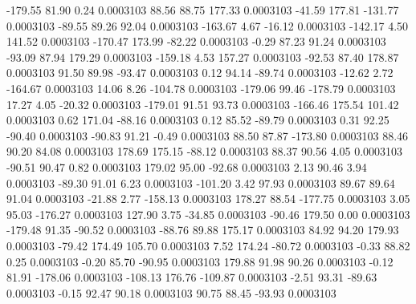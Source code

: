      -179.55       81.90        0.24     0.0003103
       88.56       88.75      177.33     0.0003103
      -41.59      177.81     -131.77     0.0003103
      -89.55       89.26       92.04     0.0003103
     -163.67        4.67      -16.12     0.0003103
     -142.17        4.50      141.52     0.0003103
     -170.47      173.99      -82.22     0.0003103
       -0.29       87.23       91.24     0.0003103
      -93.09       87.94      179.29     0.0003103
     -159.18        4.53      157.27     0.0003103
      -92.53       87.40      178.87     0.0003103
       91.50       89.98      -93.47     0.0003103
        0.12       94.14      -89.74     0.0003103
      -12.62        2.72     -164.67     0.0003103
       14.06        8.26     -104.78     0.0003103
     -179.06       99.46     -178.79     0.0003103
       17.27        4.05      -20.32     0.0003103
     -179.01       91.51       93.73     0.0003103
     -166.46      175.54      101.42     0.0003103
        0.62      171.04      -88.16     0.0003103
        0.12       85.52      -89.79     0.0003103
        0.31       92.25      -90.40     0.0003103
      -90.83       91.21       -0.49     0.0003103
       88.50       87.87     -173.80     0.0003103
       88.46       90.20       84.08     0.0003103
      178.69      175.15      -88.12     0.0003103
       88.37       90.56        4.05     0.0003103
      -90.51       90.47        0.82     0.0003103
      179.02       95.00      -92.68     0.0003103
        2.13       90.46        3.94     0.0003103
      -89.30       91.01        6.23     0.0003103
     -101.20        3.42       97.93     0.0003103
       89.67       89.64       91.04     0.0003103
      -21.88        2.77     -158.13     0.0003103
      178.27       88.54     -177.75     0.0003103
        3.05       95.03     -176.27     0.0003103
      127.90        3.75      -34.85     0.0003103
      -90.46      179.50        0.00     0.0003103
     -179.48       91.35      -90.52     0.0003103
      -88.76       89.88      175.17     0.0003103
       84.92       94.20      179.93     0.0003103
      -79.42      174.49      105.70     0.0003103
        7.52      174.24      -80.72     0.0003103
       -0.33       88.82        0.25     0.0003103
       -0.20       85.70      -90.95     0.0003103
      179.88       91.98       90.26     0.0003103
       -0.12       81.91     -178.06     0.0003103
     -108.13      176.76     -109.87     0.0003103
       -2.51       93.31      -89.63     0.0003103
       -0.15       92.47       90.18     0.0003103
       90.75       88.45      -93.93     0.0003103
